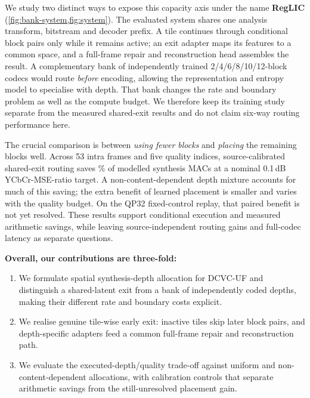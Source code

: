 We study two distinct ways to expose this capacity axis under the name
\textbf{RegLIC} (\cref{fig:bank-system,fig:system}). The evaluated system
shares one analysis transform, bitstream and decoder prefix. A tile
continues through conditional block pairs only while it remains active;
an exit adapter maps its features to a common space, and a full-frame
repair and reconstruction head assembles the result. A complementary
bank of independently trained 2/4/6/8/10/12-block codecs would route
\emph{before} encoding, allowing the representation and entropy model
to specialise with depth. That bank changes the rate and boundary
problem as well as the compute budget. We therefore keep its training
study separate from the measured shared-exit results and do not claim
six-way routing performance here.

The crucial comparison is between \emph{using fewer blocks} and
\emph{placing} the remaining blocks well. Across 53 intra frames and
five quality indices, source-calibrated shared-exit routing saves
\MainRouterSaving\% of modelled synthesis MACs at a nominal
0.1\,dB YCbCr-MSE-ratio target. A non-content-dependent depth mixture
accounts for much of this saving; the extra benefit of learned
placement is smaller and varies with the quality budget. On the QP32
fixed-control replay, that paired benefit is not yet resolved. These
results support conditional execution and measured arithmetic savings,
while leaving source-independent routing gains and full-codec latency
as separate questions.

\noindent\textbf{Overall, our contributions are three-fold:}
\begin{enumerate}
\item We formulate spatial synthesis-depth allocation for DCVC-UF and
distinguish a shared-latent exit from a bank of independently coded
depths, making their different rate and boundary costs explicit.
\item We realise genuine tile-wise early exit: inactive tiles skip later
block pairs, and depth-specific adapters feed a common full-frame
repair and reconstruction path.
\item We evaluate the executed-depth/quality trade-off against uniform
and non-content-dependent allocations, with calibration controls that
separate arithmetic savings from the still-unresolved placement gain.
\end{enumerate}
